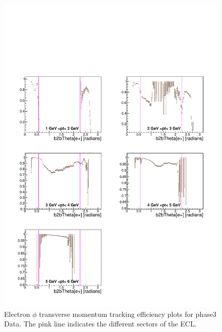 \documentclass[a4paper,11pt,twosided,final,german,openbib,pdftex,listof=totoc,bibliography=totoc]{scrbook}
\begin{document}
\begin{appendix}
\begin{figure}[!htbp]
	\centering
	\includegraphics[width=\textwidth]{Plots/master3/xPtMThetaem_DataP3}
	\caption[Transverse Momentum $\theta$ Electron Efficiency Phase3 Data]{Electron $\phi$ transverse momentum tracking efficiency plots for phase3 Data. The pink line indicates the different sectors of the ECL.}
	\label{plt:PtMThetaem3_Data}
\end{figure}





\end{appendix}
\end{document}
